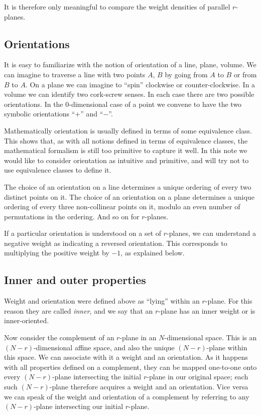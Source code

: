 \documentclass[\ifafour a4paper,12pt,\else a5paper,10pt,\fi%
onecolumn,oneside,article,%
british%
]{memoir}
\theoremstyle{remark}
\theoremstyle{innote}
\renewcommand*{\|}{\nonscript\,\vert\nonscript\;\mathopen{}}
\newcommand*{\yr}{r}
\newcommand*{\yN}{N}
\begin{document}
It is therefore only meaningful to compare the weight densities of parallel
$\yr$-planes.


\subsection{Orientations}
\label{sec:orientations2}

It is easy to familiarize with the notion of orientation of a line, plane,
volume. We can imagine to traverse a line with two points $A$, $B$ by going
from $A$ to $B$ or from $B$ to $A$. On a plane we can imagine to
\enquote{spin} clockwise or counter-clockwise. In a volume we can identify
two cork-screw senses. In each case there are two possible orientations. In
the $0$-dimensional case of a point we convene to have the two symbolic
orientations \enquote{$+$} and \enquote{$-$}. 

Mathematically orientation is usually defined in terms of some equivalence
class. This shows that, as with all notions defined in terms of equivalence
classes, the mathematical formalism is still too primitive to capture it
well. In this note we would like to consider orientation as intuitive and
primitive, and will try not to use equivalence classes to define it.

The choice of an orientation on a line determines a unique ordering of
every two distinct points on it. The choice of an orientation on a plane
determines a unique ordering of every three non-collinear points on it,
modulo an even number of permutations in the ordering. And so on for
$\yr$-planes.

If a particular orientation is understood on a set of $\yr$-planes, we can
understand a negative weight as indicating a reversed orientation. This
corresponds to multiplying the positive weight by $-1$, as explained below.


\subsection{Inner and outer properties}
\label{sec:inner_outer_properties}

Weight and orientation were defined above as \enquote{lying} within an
$\yr$-plane. For this reason they are called \emph{inner}, and we say that
an $\yr$-plane has an inner weight or is inner-oriented.

Now consider the complement of an $\yr$-plane in an $\yN$-dimensional
space. This is an $(\yN-\yr)$-dimensional affine space, and also the unique
$(\yN-\yr)$-plane within this space. We can associate with it a weight and an
orientation. As it happens with all properties defined on a complement, they
can be mapped one-to-one onto every $(\yN-\yr)$-plane intersecting the
initial $\yr$-plane in our original space; each such $(\yN-\yr)$-plane
therefore acquires a weight and an orientation. Vice versa we can
speak of the weight and orientation of a complement by referring to any
$(\yN-\yr)$-plane intersecting our initial $\yr$-plane.
\end{document}
